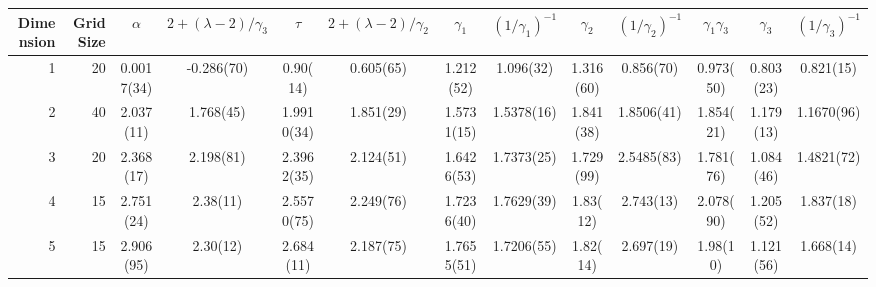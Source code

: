 \begin{tabular}{rr|ccccccccccc}
\toprule
Dimension & Grid Size & $\alpha$ & $2 + (\lambda - 2)/\gamma_3$ & $\tau$ & $2 + (\lambda - 2)/\gamma_2$ & $\gamma_1$ & $(1/\gamma_1)^{-1}$ & $\gamma_2$ & $(1/\gamma_2)^{-1}$ & $\gamma_1 \gamma_3$ & $\gamma_3$ & $(1/\gamma_3)^{-1}$ \\
\midrule
1 & 20 & 0.0017(34) & -0.286(70) & 0.90(14) & 0.605(65) & 1.212(52) & 1.096(32) & 1.316(60) & 0.856(70) & 0.973(50) & 0.803(23) & 0.821(15) \\
2 & 40 & 2.037(11) & 1.768(45) & 1.9910(34) & 1.851(29) & 1.5731(15) & 1.5378(16) & 1.841(38) & 1.8506(41) & 1.854(21) & 1.179(13) & 1.1670(96) \\
3 & 20 & 2.368(17) & 2.198(81) & 2.3962(35) & 2.124(51) & 1.6426(53) & 1.7373(25) & 1.729(99) & 2.5485(83) & 1.781(76) & 1.084(46) & 1.4821(72) \\
4 & 15 & 2.751(24) & 2.38(11) & 2.5570(75) & 2.249(76) & 1.7236(40) & 1.7629(39) & 1.83(12) & 2.743(13) & 2.078(90) & 1.205(52) & 1.837(18) \\
5 & 15 & 2.906(95) & 2.30(12) & 2.684(11) & 2.187(75) & 1.7655(51) & 1.7206(55) & 1.82(14) & 2.697(19) & 1.98(10) & 1.121(56) & 1.668(14) \\
\bottomrule
\end{tabular}
